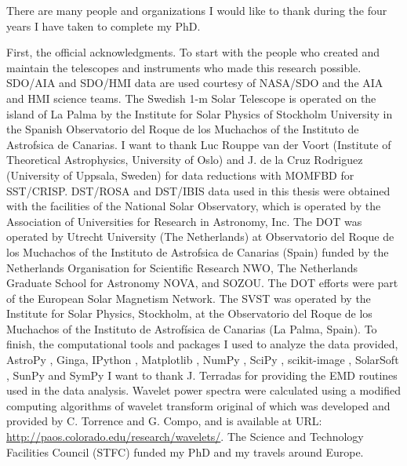 \begin{acknowledgements}      
    
    There are many people and organizations I would like to thank during the four years I have taken to complete my PhD.
    
    First, the official acknowledgments.
    To start with the people who created and maintain the telescopes and instruments who made this research possible.
    SDO/AIA and SDO/HMI data are used courtesy of NASA/SDO and the AIA and HMI science teams.
    The Swedish 1-m Solar Telescope is operated on the island of La Palma by the Institute for Solar Physics of Stockholm University in the Spanish Observatorio del Roque de los Muchachos of the Instituto de Astrofsica de Canarias.
    I want to thank Luc Rouppe van der Voort (Institute of Theoretical Astrophysics, University of Oslo) and J. de la Cruz Rodriguez (University of Uppsala, Sweden) for data reductions with MOMFBD for SST/CRISP.
    DST/ROSA and DST/IBIS data used in this thesis were obtained with the facilities of the National Solar Observatory, which is operated by the Association of Universities for Research in Astronomy, Inc.
    The DOT was operated by Utrecht University (The Netherlands) at Observatorio del Roque de los Muchachos of the Instituto de Astrofsica de Canarias (Spain) funded by the Netherlands Organisation for Scientific Research NWO, The Netherlands Graduate School for Astronomy NOVA, and SOZOU.
    The DOT efforts were part of the European Solar Magnetism Network.
    The SVST was operated by the Institute for Solar Physics, Stockholm, at the Observatorio del Roque de los Muchachos of the Instituto de Astrofísica de Canarias (La Palma, Spain).
    To finish, the computational tools and packages I used to analyze the data provided, AstroPy \citep{theastropycollaboration2013}, Ginga, IPython \citep{perez2007}, Matplotlib \citep{hunter2007}, NumPy \citep{jones2001}, SciPy \citep{jones2001}, scikit-image \citep{vanderwalt2014}, SolarSoft \citep{1998SoPh..182..497F}, SunPy \citep{thesunpycommunity2015a} and SymPy \cite{sympydevelopmentteam2014}
    I want to thank J. Terradas for providing the EMD routines used in the data analysis.
    Wavelet power spectra were calculated using a modified computing algorithms of wavelet transform original of which was developed and provided by C. Torrence and G. Compo, and is available at URL: \url{http://paos.colorado.edu/research/wavelets/}.
    The Science and Technology Facilities Council (STFC) funded my PhD and my travels around Europe.
    

\end{acknowledgements}

